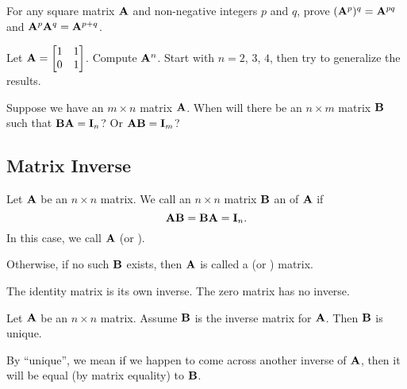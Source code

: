 \begin{problem}
  For any square matrix $\mathbf{A}$ and non-negative integers $p$ and $q$,
  prove $(\mathbf{A}^{p})^{q} = \mathbf{A}^{pq}$
  and $\mathbf{A}^{p}\mathbf{A}^{q}=\mathbf{A}^{p+q}$.
\end{problem}

\begin{problem}
Let $\displaystyle\mathbf{A}=\begin{bmatrix}1 & 1\\0 & 1 \end{bmatrix}$.
Compute $\mathbf{A}^{n}$. Start with $n=2$, $3$, $4$, then try to
generalize the results.
\end{problem}

Suppose we have an $m\times n$ matrix $\mathbf{A}$. When will there be an
$n\times m$ matrix $\mathbf{B}$ such that $\mathbf{B}\mathbf{A}=\mathbf{I}_{n}$? Or
$\mathbf{A}\mathbf{B}=\mathbf{I}_{m}$?

\subsection{Matrix Inverse}

\begin{definition}
Let $\mathbf{A}$ be an $n\times n$ matrix.
We call an $n\times n$ matrix $\mathbf{B}$ an  of $\mathbf{A}$
if
\begin{equation}
\mathbf{A}\mathbf{B}=\mathbf{B}\mathbf{A}=\mathbf{I}_{n}.
\end{equation}
In this case, we call $\mathbf{A}$  (or ).

Otherwise, if no such $\mathbf{B}$ exists, then $\mathbf{A}$ is called a
 (or ) matrix.
\end{definition}

\begin{example}
The identity matrix is its own inverse. The zero matrix has no inverse.
\end{example}

\begin{theorem}
Let $\mathbf{A}$ be an $n\times n$ matrix. Assume $\mathbf{B}$ is the inverse
matrix for $\mathbf{A}$. Then $\mathbf{B}$ is unique.
\end{theorem}

By ``unique'', we mean if we happen to come across another inverse of
$\mathbf{A}$, then it will be equal (by matrix equality) to $\mathbf{B}$.

